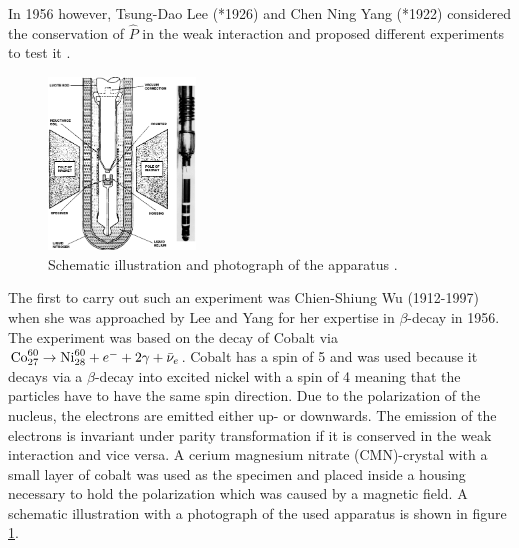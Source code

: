In 1956 however, Tsung-Dao Lee (*1926) and Chen Ning Yang (*1922) considered the conservation of $\hat P$ in the weak interaction and proposed different experiments to test it  \cite{PhysRev.104.254}.
\begin{figure}
    \centering
    \includegraphics[width=0.35\textwidth]{figs/setup.png}
    \caption{Schematic illustration and photograph of the apparatus \cite{NIST}.}
    \label{fig:setup}
\end{figure}
The first to carry out such an experiment was Chien-Shiung Wu (1912-1997) when she was approached by Lee and Yang for her expertise in $\beta$-decay in 1956.
The experiment was based on the decay of Cobalt via $\text{Co}^{60}_{27}\rightarrow \text{Ni}^{60}_{28}+e^-+2\gamma+\bar\nu_e$.
Cobalt has a spin of 5 and was used because it decays via a $\beta$-decay into excited nickel with a spin of 4 meaning that the particles have to have the same spin direction.
Due to the polarization of the nucleus, the electrons are emitted either up- or downwards.
The emission of the electrons is invariant under parity transformation if it is conserved in the weak interaction and vice versa.
A cerium magnesium nitrate (CMN)-crystal with a small layer of cobalt was used as the specimen and placed inside a housing necessary to hold the polarization \cite{CaseStudies} which was caused by a magnetic field.
A schematic illustration with a photograph of the used apparatus is shown in figure \ref{fig:setup}.
